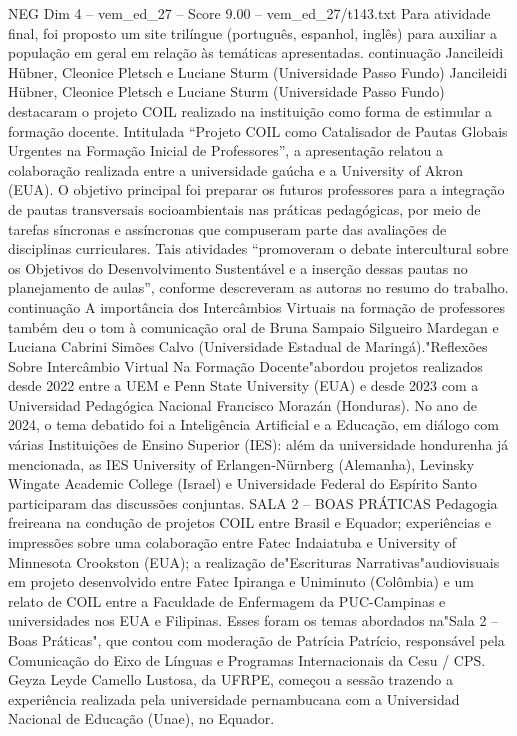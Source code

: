 \begin{textsample}{NEG Dim 4 – vem\_ed\_27 – Score 9.00 – vem\_ed\_27/t143.txt}
Para atividade final, foi proposto um site trilíngue (português, espanhol, inglês) para auxiliar a população em geral em relação às temáticas apresentadas. continuação Jancileidi Hübner, Cleonice Pletsch e Luciane Sturm (Universidade Passo Fundo) Jancileidi Hübner, Cleonice Pletsch e Luciane Sturm (Universidade Passo Fundo) destacaram o projeto COIL realizado na instituição como forma de estimular a formação docente.
Intitulada “Projeto COIL como Catalisador de Pautas Globais Urgentes na Formação Inicial de Professores”, a apresentação relatou a colaboração realizada entre a universidade gaúcha e a University of Akron (EUA).
O objetivo principal foi preparar os futuros professores para a integração de pautas transversais socioambientais nas práticas pedagógicas, por meio de tarefas síncronas e assíncronas que compuseram parte das avaliações de disciplinas curriculares.
Tais atividades “promoveram o debate intercultural sobre os Objetivos do Desenvolvimento Sustentável e a inserção dessas pautas no planejamento de aulas”, conforme descreveram as autoras no resumo do trabalho. continuação A importância dos Intercâmbios Virtuais na formação de professores também deu o tom à comunicação oral de Bruna Sampaio Silgueiro Mardegan e Luciana Cabrini Simões Calvo (Universidade Estadual de Maringá)."Reflexões Sobre Intercâmbio Virtual Na Formação Docente"abordou projetos realizados desde 2022 entre a UEM e Penn State University (EUA) e desde 2023 com a Universidad Pedagógica Nacional Francisco Morazán (Honduras).
No ano de 2024, o tema debatido foi a Inteligência Artificial e a Educação, em diálogo com várias Instituições de Ensino Superior (IES): além da universidade hondurenha já mencionada, as IES University of Erlangen-Nürnberg (Alemanha), Levinsky Wingate Academic College (Israel) e Universidade Federal do Espírito Santo participaram das discussões conjuntas.
SALA 2 – BOAS PRÁTICAS Pedagogia freireana na condução de projetos COIL entre Brasil e Equador; experiências e impressões sobre uma colaboração entre Fatec Indaiatuba e University of Minnesota Crookston (EUA); a realização de"Escrituras Narrativas"audiovisuais em projeto desenvolvido entre Fatec Ipiranga e Uniminuto (Colômbia) e um relato de COIL entre a Faculdade de Enfermagem da PUC-Campinas e universidades nos EUA e Filipinas.
Esses foram os temas abordados na"Sala 2 – Boas Práticas", que contou com moderação de Patrícia Patrício, responsável pela Comunicação do Eixo de Línguas e Programas Internacionais da Cesu / CPS.
Geyza Leyde Camello Lustosa, da UFRPE, começou a sessão trazendo a experiência realizada pela universidade pernambucana com a Universidad Nacional de Educação (Unae), no Equador.

\end{textsample}

